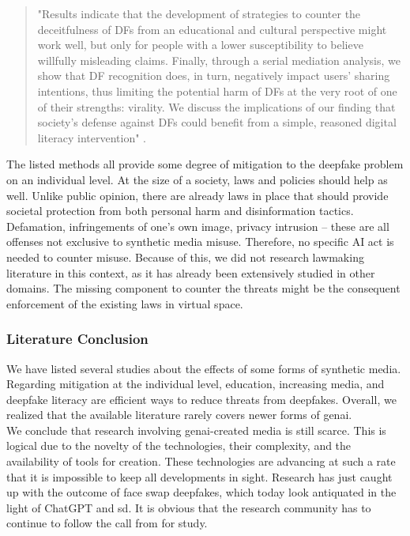\documentclass[
  a4paper,  %
  twoside,  %
  bibliography=totoc,
  headsepline,
  cleardoublepage=empty,
  parskip=half,
  draft=false
]{scrbook}
\begin{document}
\begin{quotation}
"Results indicate that the development of strategies to counter the deceitfulness of DFs from an educational and cultural perspective might work well, but only for people with a lower susceptibility to believe willfully misleading claims. Finally, through a serial mediation analysis, we show that DF recognition does, in turn, negatively impact users' sharing intentions, thus limiting the potential harm of DFs at the very root of one of their strengths: virality. We discuss the implications of our finding that society's defense against DFs could benefit from a simple, reasoned digital literacy intervention" \cite[p. 194]{iacobucciDeepfakesUnmaskedEffects2021}.
\end{quotation}

The listed methods all provide some degree of mitigation to the deepfake problem on an individual level. At the size of a society, laws and policies should help as well. Unlike public opinion, there are already laws in place that should provide societal protection from both personal harm and disinformation tactics. Defamation, infringements of one's own image, privacy intrusion – these are all offenses not exclusive to synthetic media misuse. Therefore, no specific AI act is needed to counter misuse. Because of this, we did not research lawmaking literature in this context, as it has already been extensively studied in other domains. The missing component to counter the threats might be the consequent enforcement of the existing laws in virtual space. 

\subsubsection*{Literature Conclusion}
We have listed several studies about the effects of some forms of synthetic media. Regarding mitigation at the individual level, education, increasing media, and deepfake literacy are efficient ways to reduce threats from deepfakes. Overall, we realized that the available literature rarely covers newer forms of \gls{genai}. \\
We conclude that research involving \gls{genai}-created media is still scarce. This is logical due to the novelty of the technologies, their complexity, and the availability of tools for creation. These technologies are advancing at such a rate that it is impossible to keep all developments in sight. Research has just caught up with the outcome of face swap deepfakes, which today look antiquated in the light of ChatGPT and \gls{sd}. It is obvious that the research community has to continue to follow the call from \citet{hancockSocialImpactDeepfakes2021} for study.
\end{document}

